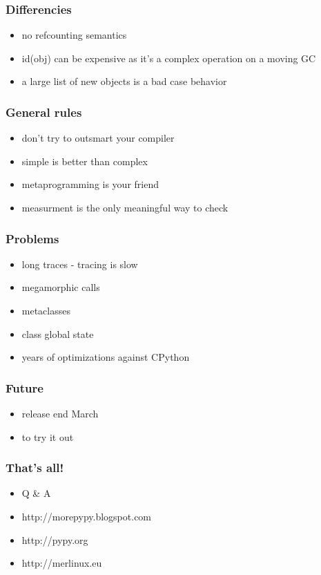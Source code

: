 \documentclass[utf8x, 14pt]{beamer}
\begin{document}
\begin{frame}
  \frametitle{Differencies}
  \begin{itemize}
    \item no refcounting semantics
    \item {\ttfamily id(obj)} can be expensive as it's a complex
      operation on a moving GC
    \item a large list of new objects is a bad case behavior
  \end{itemize}
\end{frame}

\begin{frame}
  \frametitle{General rules}
  \begin{itemize}
    \item don't try to outsmart your compiler
    \item simple is better than complex
    \item metaprogramming is your friend
    \item measurment is the only meaningful way to check
  \end{itemize}
\end{frame}

\begin{frame}
  \frametitle{Problems}
  \begin{itemize}
    \item long traces - tracing is slow
    \item megamorphic calls
    \item metaclasses
    \item class global state
      \pause
    \item years of optimizations against CPython
  \end{itemize}
\end{frame}

\begin{frame}
  \frametitle{Future}
  \begin{itemize}
    \item release end March
    \item to try it out
  \end{itemize}
\end{frame}

\begin{frame}
  \frametitle{That's all!}
  \begin{itemize}
    \item Q \& A
    \item http://morepypy.blogspot.com
    \item http://pypy.org
    \item http://merlinux.eu
  \end{itemize}
\end{frame}
\end{document}
